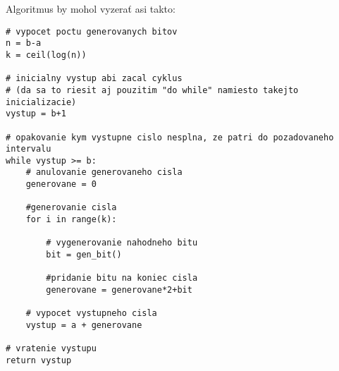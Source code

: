 \documentclass[a4paper]{article}
\begin{document}
Algoritmus by mohol vyzerať asi takto:

\begin{lstlisting}
# vypocet poctu generovanych bitov
n = b-a
k = ceil(log(n))

# inicialny vystup abi zacal cyklus
# (da sa to riesit aj pouzitim "do while" namiesto takejto inicializacie)
vystup = b+1

# opakovanie kym vystupne cislo nesplna, ze patri do pozadovaneho intervalu
while vystup >= b:
	# anulovanie generovaneho cisla
	generovane = 0
	
	#generovanie cisla
	for i in range(k):
	
		# vygenerovanie nahodneho bitu
		bit = gen_bit()
		
		#pridanie bitu na koniec cisla
		generovane = generovane*2+bit 
	
	# vypocet vystupneho cisla
	vystup = a + generovane

# vratenie vystupu
return vystup

\end{lstlisting} 

 
\end{document}
